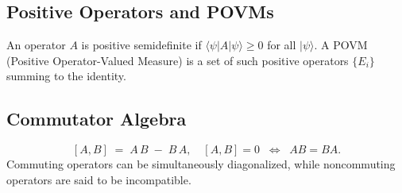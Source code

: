 \documentclass{article}
\begin{document}
\subsection*{Positive Operators and POVMs}
An operator \(A\) is positive semidefinite if \(\langle \psi \lvert A \lvert \psi\rangle \ge 0\) for all \(\lvert \psi\rangle\). A POVM (Positive Operator-Valued Measure) is a set of such positive operators \(\{E_i\}\) summing to the identity.

\subsection*{Commutator Algebra}
\[
[A,B] \;=\; A\,B \;-\; B\,A, 
\quad
[A,B] = 0 \;\; \Longleftrightarrow \;\; AB=BA.
\]
Commuting operators can be simultaneously diagonalized, while noncommuting operators are said to be incompatible.

\end{document}
